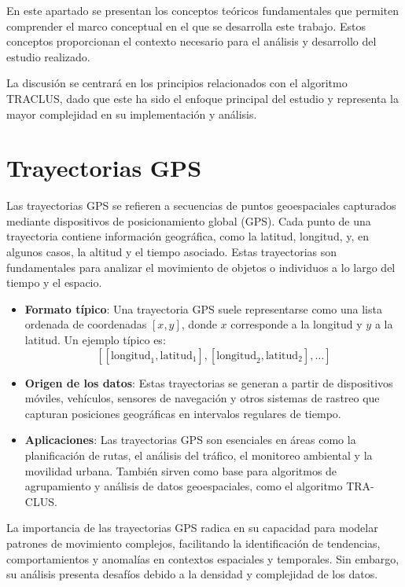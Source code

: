 
En este apartado se presentan los conceptos teóricos fundamentales que permiten comprender el marco conceptual en el que se desarrolla este trabajo. Estos conceptos proporcionan el contexto necesario para el análisis y desarrollo del estudio realizado.

La discusión se centrará en los principios relacionados con el algoritmo TRACLUS, dado que este ha sido el enfoque principal del estudio y representa la mayor complejidad en su implementación y análisis.

\section{Trayectorias GPS}

Las trayectorias GPS se refieren a secuencias de puntos geoespaciales capturados mediante dispositivos de posicionamiento global (GPS). Cada punto de una trayectoria contiene información geográfica, como la latitud, longitud, y, en algunos casos, la altitud y el tiempo asociado. Estas trayectorias son fundamentales para analizar el movimiento de objetos o individuos a lo largo del tiempo y el espacio.

\begin{itemize}
    \item \textbf{Formato típico}: Una trayectoria GPS suele representarse como una lista ordenada de coordenadas \([x, y]\), donde \(x\) corresponde a la longitud y \(y\) a la latitud. Un ejemplo típico es:
    \[
    [[\text{longitud}_1, \text{latitud}_1], [\text{longitud}_2, \text{latitud}_2], \dots]
    \]
    \item \textbf{Origen de los datos}: Estas trayectorias se generan a partir de dispositivos móviles, vehículos, sensores de navegación y otros sistemas de rastreo que capturan posiciones geográficas en intervalos regulares de tiempo.
    \item \textbf{Aplicaciones}: Las trayectorias GPS son esenciales en áreas como la planificación de rutas, el análisis del tráfico, el monitoreo ambiental y la movilidad urbana. También sirven como base para algoritmos de agrupamiento y análisis de datos geoespaciales, como el algoritmo TRA-CLUS.
\end{itemize}

La importancia de las trayectorias GPS radica en su capacidad para modelar patrones de movimiento complejos, facilitando la identificación de tendencias, comportamientos y anomalías en contextos espaciales y temporales. Sin embargo, su análisis presenta desafíos debido a la densidad y complejidad de los datos.


